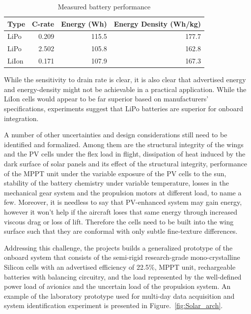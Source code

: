 \documentclass{ifacconf}
\begin{document}
\begin{table}
  \caption{Measured battery performance}
  \centering
  \begin{tabular}{ l | r | r | r }
  Type &C-rate & Energy (Wh) & Energy Density (Wh/kg) \\
  \hline
  LiPo & 0.209 & 115.5 & 177.7 \\
  LiPo & 2.502 & 105.8 & 162.8 \\
  LiIon & 0.171 & 107.9 & 167.3 \\
  \end{tabular}
  \label{Batt_performance}
\end{table}
While the sensitivity to drain rate is clear, it is also clear that
advertised energy and energy-density might not be achievable in a practical
application. While the LiIon cells would appear to be far superior based on
manufacturers' specifications, experiments suggest that LiPo batteries are
superior for onboard integration.

A number of other uncertainties and design considerations still need to be
identified and formalized. Among them are the structural integrity of the
wings and the PV cells under the flex load in flight, dissipation of heat
induced by the dark surface of solar panels and its effect of the structural
integrity,  performance of the MPPT unit under the variable exposure of the
PV cells to the sun, stability of the battery chemistry under variable
temperature, losses in the mechanical gear system and the propulsion motors
at different load, to name a few. Moreover, it is needless to say that
PV-enhanced system may gain energy, however it won't help if the aircraft
loses that same energy through increased viscous drag or loss of lift.
Therefore the cells need to be built into the wing surface such that they are
conformal with only subtle fine-texture differences.
%

Addressing this challenge, the projects builds a generalized prototype of the
onboard system that consists of the semi-rigid research-grade
mono-crystalline Silicon cells with an advertised efficiency of 22.5$\%$,
MPPT unit, rechargeable batteries with balancing circuitry, and the load
represented by the well-defined power load of avionics and the uncertain load
of the propulsion system. An example of the laboratory prototype used for
multi-day data acquisition and system identification experiment is presented
in Figure.~\ref{fig:Solar_arch}.
\end{document}
